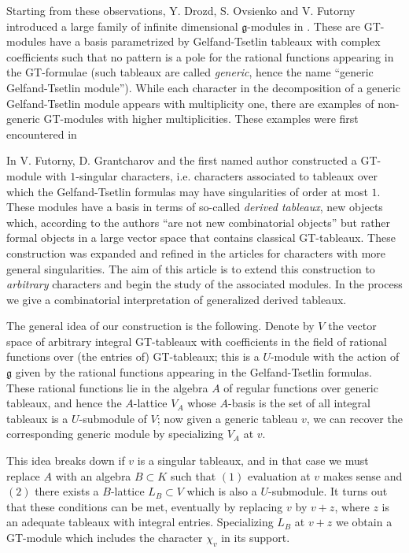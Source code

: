 \documentclass[11pt,fleqn]{article}
\newcounter{para}[section]
\newcommand\g{\mathfrak g}
\begin{document}
Starting from these observations, Y. Drozd, S. Ovsienko and V. Futorny 
introduced a large family of infinite dimensional $\g$-modules in 
\cite{DFO-GT-modules}. These are GT-modules have a basis parametrized by 
Gelfand-Tsetlin tableaux with complex coefficients such that no pattern is a 
pole for the rational functions appearing in the GT-formulae (such tableaux 
are called \emph{generic}, hence the name ``generic Gelfand-Tsetlin module''). 
While each character in the decomposition of a generic Gelfand-Tsetlin module
appears with multiplicity one, there are examples of non-generic GT-modules
with higher multiplicities. These examples were first encountered in 

In \cite{FGR-1-singular} V. Futorny, D. Grantcharov and the first named author
constructed a GT-module with $1$-singular characters, i.e. characters 
associated to tableaux over which the Gelfand-Tsetlin formulas may have 
singularities of order at most $1$. These modules have a basis in terms of 
so-called \emph{derived tableaux}, new objects which, according to the authors 
``are not new combinatorial objects'' but rather formal objects in a large
vector space that contains classical GT-tableaux. These construction was 
expanded and refined in the articles \cites{FGR-2-index, Zad-1-sing, 
V-geometric-singular-GT} for characters with more general singularities. The 
aim of this article is to extend this construction to \emph{arbitrary} 
characters and begin the study of the associated modules. In the process we 
give a combinatorial interpretation of generalized derived tableaux.

The general idea of our construction is the following. Denote by $V$ the vector
space of arbitrary integral GT-tableaux with coefficients in the field of 
rational functions over (the entries of) GT-tableaux; this is a $U$-module 
with the action of $\g$ given by the rational functions appearing in the 
Gelfand-Tsetlin formulas. These rational functions lie in the algebra $A$ of 
regular functions over generic tableaux, and hence the $A$-lattice $V_A$ whose 
$A$-basis is the set of all integral tableaux is a $U$-submodule of $V$; now 
given a generic tableau $v$, we can recover the corresponding generic module 
by specializing $V_A$ at $v$.

This idea breaks down if $v$ is a singular tableaux, and in that case we must
replace $A$ with an algebra $B \subset K$ such that $(1)$ evaluation at $v$ 
makes sense and $(2)$ there exists a $B$-lattice $L_B \subset V$ which is also
a $U$-submodule. It turns out that these conditions can be met, eventually by
replacing $v$ by $v+z$, where $z$ is an adequate tableaux with integral 
entries. Specializing $L_B$ at $v+z$ we obtain a GT-module which includes 
the character $\chi_v$ in its support.
\end{document}
